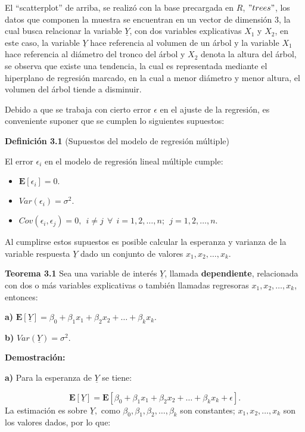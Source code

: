 \documentclass[
  a4paper,
  oneside,
  openany]{book}
\begin{document}
El ``scatterplot'' de arriba, se realizó con la base precargada en \(R\), \("trees"\), los datos que componen la muestra se encuentran en un vector de dimensión 3, la cual busca relacionar la variable \(\underline{Y}\), con dos variables explicativas \(X_{1}\) y \(X_{2}\), en este caso, la variable \(\underline{Y}\) hace referencia al volumen de un árbol y la variable \(X_{1}\) hace referencia al diámetro del tronco del árbol y \(X_{2}\) denota la altura del árbol, se observa que existe una tendencia, la cual es representada mediante el hiperplano de regresión marcado, en la cual a menor diámetro y menor altura, el volumen del árbol tiende a disminuir.

Debido a que se trabaja con cierto error \(\epsilon\) en el ajuste de la regresión, es conveniente suponer que se cumplen lo siguientes supuestos:

\textbf{Definición 3.1} (Supuestos del modelo de regresión múltiple)

El error \(\epsilon_{i}\) en el modelo de regresión lineal múltiple cumple:

\begin{itemize}
\item
  \(\mathbf{E}[\epsilon_{i}]=0.\)
\item
  \(Var(\epsilon_{i})=\sigma^2.\)
\item
  \(Cov(\epsilon_{i},\epsilon_{j})=0, \ \ i \neq j \ \ \forall \ \ i= 1,2,\ldots,n; \ \ j= 1,2,\ldots,n.\)
\end{itemize}

Al cumplirse estos supuestos es posible calcular la esperanza y varianza de la variable respuesta \(\underline{Y}\) dado un conjunto de valores \(x_{1},x_{2},\ldots,x_{k}.\)

\textbf{Teorema 3.1} Sea una variable de interés \(\underline{Y}\), llamada \textbf{dependiente}, relacionada con dos o más variables explicativas o también llamadas regresoras \(x_{1},x_{2},\ldots,x_{k}\),
entonces:

\textbf{a)} \(\mathbf{E}[\underline{Y}]= \beta_{0}+\beta_{1}x_{1}+\beta_{2}x_{2}+ \ldots + \beta_{k}x_{k}.\)

\textbf{b)} \(Var(\underline{Y})= \sigma^2.\)

\textbf{Demostración:}

\textbf{a)} Para la esperanza de \(\underline{Y}\) se tiene:

\[\mathbf{E}[\underline{Y}]=\mathbf{E}[\beta_{0}+\beta_{1}x_{1}+\beta_{2}x_{2}+ \ldots +\beta_{k}x_{k}+\epsilon].\]
La estimación es sobre \(\underline{Y},\)
como \(\beta_{0},\beta_{1},\beta_{2},\ldots,\beta_{k}\) son constantes; \(x_{1},x_{2}, \ldots,x_{k}\) son los valores dados, por lo que:
\end{document}
